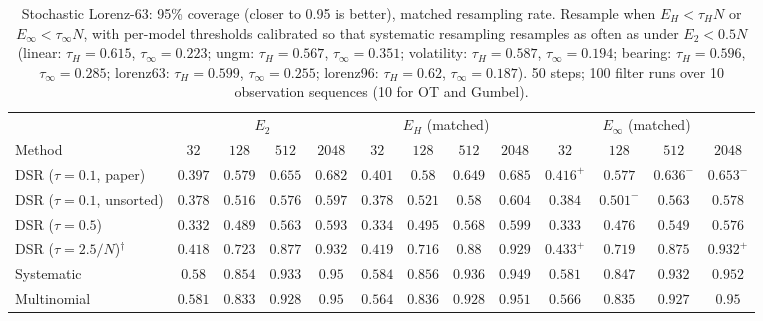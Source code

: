 \begin{table}[ht]
\centering
\small
\caption{Stochastic Lorenz-63: 95\% coverage (closer to 0.95 is better), matched resampling rate. Resample when $E_H<\tau_HN$ or $E_\infty<\tau_\infty N$, with per-model thresholds calibrated so that systematic resampling resamples as often as under $E_2<0.5N$ (linear: $\tau_H{=}0.615$, $\tau_\infty{=}0.223$; ungm: $\tau_H{=}0.567$, $\tau_\infty{=}0.351$; volatility: $\tau_H{=}0.587$, $\tau_\infty{=}0.194$; bearing: $\tau_H{=}0.596$, $\tau_\infty{=}0.285$; lorenz63: $\tau_H{=}0.599$, $\tau_\infty{=}0.255$; lorenz96: $\tau_H{=}0.62$, $\tau_\infty{=}0.187$). 50 steps; 100 filter runs over 10 observation sequences (10 for OT and Gumbel).}
\label{tab:trigger-matched-lorenz63-coverage95}
\begin{adjustbox}{max width=\linewidth}
\begin{tabular}{lcccc|cccc|cccc}
\toprule
 & \multicolumn{4}{c}{$E_2$} & \multicolumn{4}{c}{$E_H$ (matched)} & \multicolumn{4}{c}{$E_\infty$ (matched)} \\
\cmidrule(lr){2-5} \cmidrule(lr){6-9} \cmidrule(lr){10-13}
Method & $32$ & $128$ & $512$ & $2048$ & $32$ & $128$ & $512$ & $2048$ & $32$ & $128$ & $512$ & $2048$ \\
\midrule
DSR ($\tau{=}0.1$, paper) & $0.397$ & $0.579$ & $\mathbf{0.655}$ & $0.682$ & $0.401$ & $\mathbf{0.58}$ & $0.649$ & $\mathbf{0.685}$ & $\mathbf{0.416}^{+}$ & $0.577$ & $0.636^{-}$ & $0.653^{-}$ \\
DSR ($\tau{=}0.1$, unsorted) & $0.378$ & $0.516$ & $0.576$ & $0.597$ & $0.378$ & $\mathbf{0.521}$ & $\mathbf{0.58}$ & $\mathbf{0.604}$ & $\mathbf{0.384}$ & $0.501^{-}$ & $0.563$ & $0.578$ \\
DSR ($\tau{=}0.5$) & $0.332$ & $0.489$ & $0.563$ & $0.593$ & $\mathbf{0.334}$ & $\mathbf{0.495}$ & $\mathbf{0.568}$ & $\mathbf{0.599}$ & $0.333$ & $0.476$ & $0.549$ & $0.576$ \\
DSR ($\tau{=}2.5/N$)$^\dagger$ & $0.418$ & $\mathbf{0.723}$ & $0.877$ & $\mathbf{0.932}$ & $0.419$ & $0.716$ & $\mathbf{0.88}$ & $0.929$ & $\mathbf{0.433}^{+}$ & $0.719$ & $0.875$ & $\mathbf{0.932}^{+}$ \\
\midrule
Systematic & $0.58$ & $0.854$ & $0.933$ & $\mathbf{0.95}$ & $\mathbf{0.584}$ & $\mathbf{0.856}$ & $\mathbf{0.936}$ & $0.949$ & $0.581$ & $0.847$ & $0.932$ & $0.952$ \\
Multinomial & $\mathbf{0.581}$ & $0.833$ & $\mathbf{0.928}$ & $\mathbf{0.95}$ & $0.564$ & $\mathbf{0.836}$ & $\mathbf{0.928}$ & $0.951$ & $0.566$ & $0.835$ & $0.927$ & $\mathbf{0.95}$ \\

\end{tabular}
\end{adjustbox}
\end{table}
